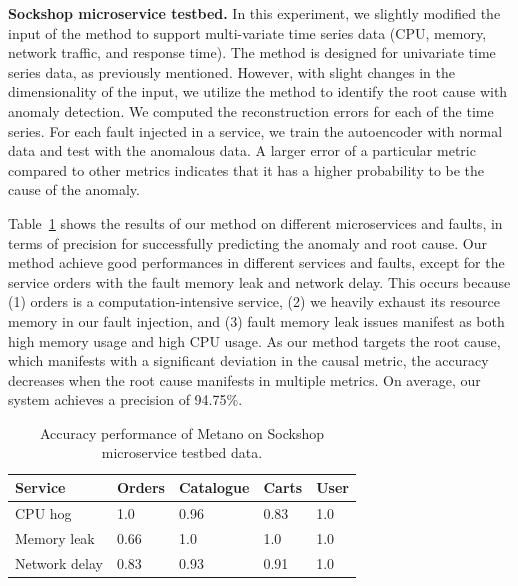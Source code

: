 \noindent\textbf{Sockshop microservice testbed.}
In this experiment, we slightly modified the input of the method to support multi-variate time series data (CPU, memory, network traffic, and response time). The method is designed for univariate time series data, as previously mentioned. However, with slight changes in the dimensionality of the input, we utilize the method to identify the root cause with anomaly detection. We computed the reconstruction errors for each of the time series.
For each fault injected in a service, we train the autoencoder with normal data and test with the anomalous data. A larger error of a particular metric compared to other metrics indicates that it has a higher probability to be the cause of the anomaly. 

Table~\ref{tabresultssockshop} shows the results of our method on different microservices and faults, in terms of precision for successfully predicting the anomaly and root cause. Our method achieve good performances in different services and faults, except for the service orders with the fault memory leak and network delay. This occurs because (1) orders is a computation-intensive service, (2) we heavily exhaust its resource memory in our fault injection, and (3) fault memory leak issues manifest as both high memory usage and high CPU usage. As our method targets the root cause, which manifests with a significant deviation in the causal metric, the accuracy decreases when the root cause manifests in multiple metrics. On average, our system achieves a precision of 94.75\%. 


\begin{table}[htbp]
\centering
\caption{Accuracy performance of Metano on Sockshop microservice testbed data.}

\begin{tabular}{lllll}
\hline
Service       & Orders & Catalogue & Carts & User \\ \hline
CPU hog       & 1.0    & 0.96      & 0.83  & 1.0  \\ 
Memory leak   & 0.66   & 1.0       & 1.0   & 1.0  \\ 
Network delay & 0.83   & 0.93      & 0.91  & 1.0  \\ \hline
\end{tabular}\label{tabresultssockshop}
\end{table}






